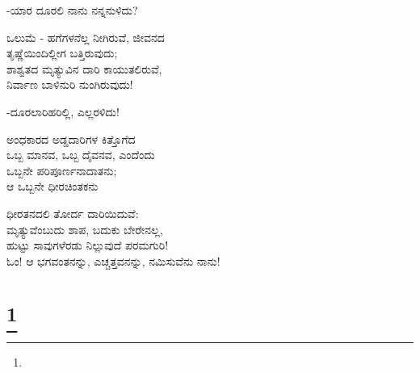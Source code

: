 \begin{flushright}
-ಯಾರ ದೂರಲಿ ನಾನು ನನ್ನನುಳಿದು?
\end{flushright}

\begin{myquote}
ಒಲುಮೆ - ಹಗೆಗಳನೆಲ್ಲ ನೀಗಿರುವೆ, ಜೀವನದ\\ತೃಷ್ಣೆಯಿಂದಿಲ್ಲೀಗ ಬತ್ತಿರುವುದು;\\ಶಾಶ್ವತದ ಮೃತ್ಯುವಿನ ದಾರಿ ಕಾಯುತಲಿರುವೆ,\\ನಿರ್ವಾಣ ಬಾಳಿನುರಿ ನುಂಗಿರುವುದು!
\end{myquote}

\begin{flushright}
-ದೂರಲಾರಿಹರಿಲ್ಲಿ, ಎಲ್ಲರಳಿದು!
\end{flushright}

\begin{myquote}
ಅಂಧಕಾರದ ಅಡ್ಡದಾರಿಗಳ ಕಿತ್ತೊಗೆದ\\ಒಬ್ಬ ಮಾನವ, ಒಬ್ಬ ದೈವನವ, ಎಂದೆಂದು\\ಒಬ್ಬನೇ ಪರಿಪೂರ್ಣನಾದಾತನು;\\ಆ ಒಬ್ಬನೇ ಧೀರಚಿಂತಕನು
\end{myquote}

\begin{myquote}
ಧೀರತನದಲಿ ತೋರ್ದ ದಾರಿಯಿದುವೆ:\\ಮೃತ್ಯುವೆಂಬುದು ಶಾಪ, ಬದುಕು ಬೇರೇನಲ್ಲ,\\ಹುಟ್ಟು ಸಾವುಗಳೆರಡು ನಿಲ್ಲುವುದೆ ಪರಮಗುರಿ!\\ಓಂ! ಆ ಭಗವಂತನನ್ನು, ಎಚ್ಚತ್ತವನನ್ನು, ನಮಿಸುವೆನು ನಾನು!
\end{myquote}

\selecteng

\chapter[KALI THE MOTHER]{\protect\footnote{}}

